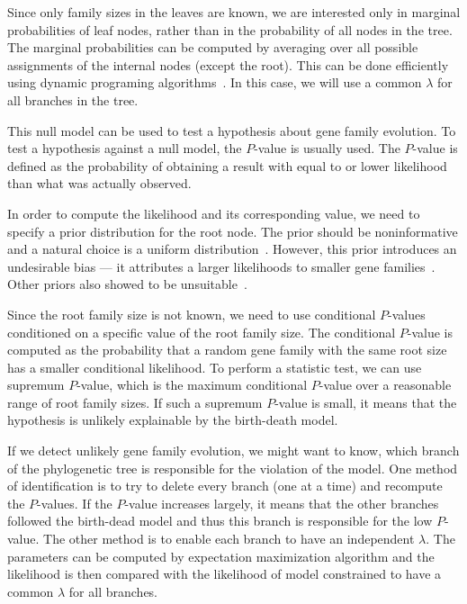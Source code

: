 Since only family sizes in the leaves are known, we are interested only in marginal probabilities of leaf nodes, rather than in the probability of all nodes in the tree. The marginal probabilities can be computed by averaging over all possible assignments of the internal nodes (except the root). This can be done efficiently using dynamic programing algorithms~\cite{felsenstein1981evolutionary}. In this case, we will use a common $\lambda$ for all branches in the tree.

This null model can be used to test a hypothesis about gene family evolution.
To test a hypothesis against a null model, the $P$-value is usually used. The $P$-value is defined as the probability of obtaining a result with equal to or lower likelihood than what was actually observed.

In order to compute the likelihood and its corresponding value, we need to specify a prior distribution for the root node. The prior should be noninformative and a natural choice is a uniform distribution~\cite{felsenstein1981evolutionary}. However, this prior introduces an undesirable bias --- it attributes a larger likelihoods to smaller gene families~\cite{hahn2005estimating}. Other priors also showed to be unsuitable~\cite{hahn2005estimating}.

Since the root family size is not known, we need to use conditional $P$-values conditioned on a specific value of the root family size.
The conditional $P$-value is computed as the probability that a random gene family with the same root size has a smaller conditional likelihood.
To perform a statistic test, we can use supremum $P$-value, which is the maximum conditional $P$-value over a reasonable range of root family sizes.
If such a supremum $P$-value is small, it means that the hypothesis is unlikely explainable by the birth-death model.

If we detect unlikely gene family evolution, we might want to know, which branch of the phylogenetic tree is responsible for the violation of the model.
One method of identification is to try to delete every branch (one at a time) and recompute the $P$-values. If the $P$-value increases largely, it means that the other branches followed the birth-dead model and thus this branch is responsible for the low $P$-value.
The other method is to enable each branch to have an independent $\lambda$. The parameters can be computed by expectation maximization algorithm and the likelihood is then compared with the likelihood of model constrained to have a common $\lambda$ for all branches.

